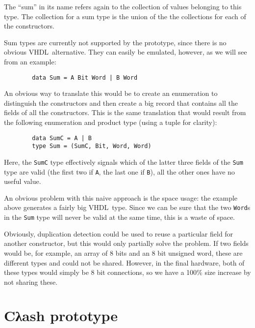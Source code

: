 \documentclass[conference]{IEEEtran}
\def\VHDL{\textsc{VHDL}}
\def\hs#1{\texttt{#1}}
\begin{document}
\begin{description}
        The ``sum'' in its name refers again to the collection of values
        belonging to this type. The collection for a sum type is the
        union of the the collections for each of the constructors.

        Sum types are currently not supported by the prototype, since there is
        no obvious \VHDL\ alternative. They can easily be emulated, however, as
        we will see from an example:

        \begin{verbatim}
        data Sum = A Bit Word | B Word
        \end{verbatim}

        An obvious way to translate this would be to create an enumeration to
        distinguish the constructors and then create a big record that
        contains all the fields of all the constructors. This is the same
        translation that would result from the following enumeration and
        product type (using a tuple for clarity):

        \begin{verbatim}
        data SumC = A | B
        type Sum = (SumC, Bit, Word, Word)
        \end{verbatim}

        Here, the \hs{SumC} type effectively signals which of the latter three
        fields of the \hs{Sum} type are valid (the first two if \hs{A}, the
        last one if \hs{B}), all the other ones have no useful value.

        An obvious problem with this naive approach is the space usage: the
        example above generates a fairly big \VHDL\ type. Since we can be
        sure that the two \hs{Word}s in the \hs{Sum} type will never be valid
        at the same time, this is a waste of space.

        Obviously, duplication detection could be used to reuse a
        particular field for another constructor, but this would only
        partially solve the problem. If two fields would be, for
        example, an array of 8 bits and an 8 bit unsigned word, these are
        different types and could not be shared. However, in the final
        hardware, both of these types would simply be 8 bit connections,
        so we have a 100\% size increase by not sharing these.
      \end{description}


\section{Cλash prototype}
\end{document}
